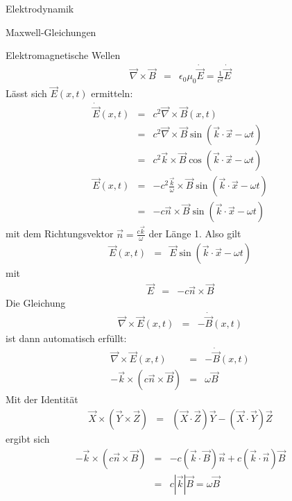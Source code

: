 \begin{chapter}{\titlestr}
\begin{section}{Elektrodynamik}
\begin{subsection}{Maxwell-Gleichungen}
\begin{subsubsection}{Elektromagnetische Wellen}
\begin{eqnarray*}
\vec{\nabla}\times\vec{B} &=& \epsilon_0\mu_0\dot{\vec{E}}=\frac{1}{c^2}\dot{\vec{E}}
\end{eqnarray*}
Lässt sich $\vec{E}(x,t)$ ermitteln:
\begin{eqnarray*}
\dot{\vec{E}}(x,t) &=& c^2\vec{\nabla}\times\vec{B}(x,t)\\
&=&c^2\vec{\nabla}\times\vec{B}\sin\left(\vec{k}\cdot \vec{x}- \omega t\right)\\
&=&c^2\vec{k}\times\vec{B}\cos\left(\vec{k}\cdot \vec{x}- \omega t\right)\\
\vec{E}(x,t) &=& -c^2\frac{\vec{k}}{\omega}\times\vec{B}\sin\left(\vec{k}\cdot \vec{x}- \omega t\right)\\
&=& -c\vec{n}\times\vec{B}\sin\left(\vec{k}\cdot \vec{x}- \omega t\right)
\end{eqnarray*}
mit dem Richtungsvektor $\vec{n}=\frac{c\vec{k}}{\omega}$ der Länge 1. Also gilt
\begin{eqnarray*}
\vec{E}(x,t) &=& \vec{E}\sin\left(\vec{k}\cdot \vec{x}- \omega t\right)
\end{eqnarray*}
mit
\begin{eqnarray*}
\vec{E} &=& -c\vec{n}\times\vec{B}
\end{eqnarray*}
Die Gleichung
\begin{eqnarray*}
\vec{\nabla}\times\vec{E}(x,t) &=& -\dot{\vec{B}}(x,t)
\end{eqnarray*}
ist dann automatisch erfüllt:
\begin{eqnarray*}
\vec{\nabla}\times\vec{E}(x,t) &=& -\dot{\vec{B}}(x,t)\\
-\vec{k}\times\left(c\vec{n}\times\vec{B}\right)&=& \omega\vec{B}
\end{eqnarray*}
Mit der Identität
\begin{eqnarray*}
\vec{X}\times\left(\vec{Y}\times\vec{Z}\right) &=&\left(\vec{X}\cdot\vec{Z}\right)\vec{Y}-\left(\vec{X}\cdot\vec{Y}\right)\vec{Z}
\end{eqnarray*}
ergibt sich
\begin{eqnarray*}
-\vec{k}\times\left(c\vec{n}\times\vec{B}\right)&=& -c\left(\vec{k}\cdot\vec{B}\right)\vec{n}+c\left(\vec{k}\cdot\vec{n}\right)\vec{B}\\
&=&c|\vec{k}|\vec{B}=\omega\vec{B}
\end{eqnarray*}
\end{subsubsection}
\end{subsection}


\end{section}
\end{chapter}
